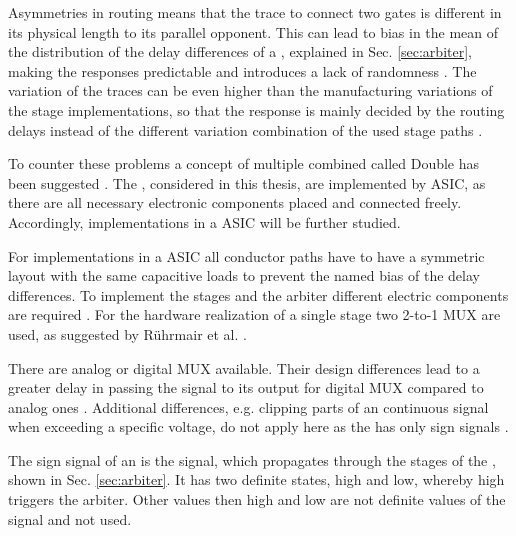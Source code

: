 Asymmetries in routing means that the trace to connect two gates is different in its physical length to its parallel opponent.
This can lead to bias in the mean of the distribution of the delay differences of a \apuf, explained in Sec. \ref{sec:arbiter}, making the responses predictable and introduces a lack of randomness \cite{Majzoobi2010FPGALines, Morozov2010AnFPGA}. %
The variation of the traces can be even higher than the manufacturing variations of the stage implementations, so that the response is mainly decided by the routing delays instead of the different variation combination of the used stage paths \cite{Majzoobi2009TechniquesPUFs}.

To counter these problems a concept of multiple combined \apuf called Double \apuf has been suggested \cite{Machida2015ImplementationFPGA, Machida2015AFPGA}.
The \apufs, considered in this thesis, are implemented by \ac{ASIC}, as there are all necessary electronic components placed and connected freely.
Accordingly, \apuf implementations in a \ac{ASIC} will be further studied.

For \apuf implementations in a \ac{ASIC} all conductor paths have to have a symmetric layout with the same capacitive loads to prevent the named bias of the delay differences.
To implement the stages and the arbiter different electric components are required \cite{Maes2012ExperimentalCMOS}. %
For the hardware realization of a single stage two 2-to-1 \ac{MUX} are used, as suggested by Rührmair et al. \cite{Ruhrmair2013PUFData, Lee2004AApplications}.%

There are analog or digital \ac{MUX} available. %
Their design differences lead to a greater delay in passing the signal to its output for digital \ac{MUX} compared to analog ones \cite{Wikipedia2016Multiplexer}.
Additional differences, e.g. clipping parts of an continuous signal when exceeding a specific voltage, do not apply here as the \apuf has only sign signals \cite{Semiconductor2002BasicComparison}. %

The sign signal of an \apuf is the signal, which propagates through the stages of the \apuf, shown in Sec. \ref{sec:arbiter}.
It has two definite states, high and low, whereby high triggers the arbiter.
Other values then high and low are not definite values of the signal and not used.

